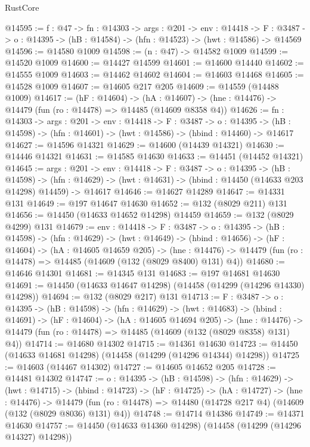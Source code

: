 \begin{lexlean}{RustCore}
\begin{coremodule}
@14595 := {f : @47} ->
  {fn : @14303} ->
  {args : @201} ->
  {env : @14418} ->
  {F : @3487} -> {o : @14395} -> (hB : @14584) -> (hfn : @14523) -> (hwt : @14586) -> @14569
@14596 := @14580 @1009
@14598 := (n : @47) -> @14582 @1009
@14599 := @14520 @1009
@14600 := @14427 @14599
@14601 := @14600 @14440
@14602 := @14555 @1009
@14603 := @14462 @14602
@14604 := @14603 @14468
@14605 := @14528 @1009
@14607 := @14605 @217 @205
@14609 := @14559 (@14488 @1009)
@14617 := (hF : @14604) ->
  (hA : @14607) -> (hne : @14476) -> @14479 (fun (ro : @14478) => @14485 (@14609 @8358 @4))
@14626 := {fn : @14303} ->
  {args : @201} ->
  {env : @14418} ->
  {F : @3487} ->
  {o : @14395} -> (hB : @14598) -> (hfn : @14601) -> (hwt : @14586) -> (hbind : @14460) -> @14617
@14627 := @14596 @14321
@14629 := @14600 (@14439 @14321)
@14630 := @14446 @14321
@14631 := @14585 @14630
@14633 := @14451 (@14452 @14321)
@14645 := {args : @201} ->
  {env : @14418} ->
  {F : @3487} ->
  {o : @14395} ->
  (hB : @14598) ->
  (hfn : @14629) -> (hwt : @14631) -> (hbind : @14450 (@14633 @203 @14298) @14459) -> @14617
@14646 := @14627 @14289
@14647 := @14331 @131
@14649 := @197 @14647 @14630
@14652 := @132 (@8029 @211) @131
@14656 := @14450 (@14633 @14652 @14298) @14459
@14659 := @132 (@8029 @4299) @131
@14679 := {env : @14418} ->
  {F : @3487} ->
  {o : @14395} ->
  (hB : @14598) ->
  (hfn : @14629) ->
  (hwt : @14649) ->
  (hbind : @14656) ->
  (hF : @14604) ->
  (hA : @14605 @14659 @205) ->
  (hne : @14476) -> @14479 (fun (ro : @14478) => @14485 (@14609 (@132 (@8029 @8400) @131) @4))
@14680 := @14646 @14301
@14681 := @14345 @131
@14683 := @197 @14681 @14630
@14691 := @14450 (@14633 @14647 @14298) (@14458 (@14299 (@14296 @14330) @14298))
@14694 := @132 (@8029 @217) @131
@14713 := {F : @3487} ->
  {o : @14395} ->
  (hB : @14598) ->
  (hfn : @14629) ->
  (hwt : @14683) ->
  (hbind : @14691) ->
  (hF : @14604) ->
  (hA : @14605 @14694 @205) ->
  (hne : @14476) -> @14479 (fun (ro : @14478) => @14485 (@14609 (@132 (@8029 @8358) @131) @4))
@14714 := @14680 @14302
@14715 := @14361 @14630
@14723 := @14450 (@14633 @14681 @14298) (@14458 (@14299 (@14296 @14344) @14298))
@14725 := @14603 (@14467 @14302)
@14727 := @14605 @14652 @205
@14728 := @14481 @14302
@14747 := {o : @14395} ->
  (hB : @14598) ->
  (hfn : @14629) ->
  (hwt : @14715) ->
  (hbind : @14723) ->
  (hF : @14725) ->
  (hA : @14727) ->
  (hne : @14476) ->
  @14479 (fun (ro : @14478) => @14480 (@14728 @217 @4) (@14609 (@132 (@8029 @8036) @131) @4))
@14748 := @14714 @14386
@14749 := @14371 @14630
@14757 := @14450 (@14633 @14360 @14298) (@14458 (@14299 (@14296 @14327) @14298))

\end{coremodule}
\end{lexlean}
